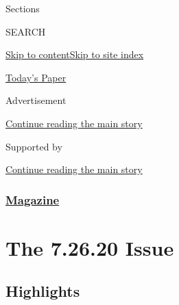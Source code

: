Sections

SEARCH

\protect\hyperlink{site-content}{Skip to
content}\protect\hyperlink{site-index}{Skip to site index}

\href{https://myaccount.nytimes.com/auth/login?response_type=cookie\&client_id=vi}{}

\href{https://www.nytimes.com/section/todayspaper}{Today's Paper}

Advertisement

\protect\hyperlink{after-top}{Continue reading the main story}

Supported by

\protect\hyperlink{after-sponsor}{Continue reading the main story}

\hypertarget{magazine}{%
\subsubsection{\texorpdfstring{\href{/section/magazine}{Magazine}}{Magazine}}\label{magazine}}

\hypertarget{the-72620-issue}{%
\section{The 7.26.20 Issue}\label{the-72620-issue}}

\hypertarget{highlights}{%
\subsection{Highlights}\label{highlights}}

